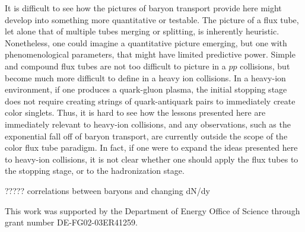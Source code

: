 \documentclass[aps, prc, 12pt, nofootinbib, showpacs, superscriptaddress, tightenlines, groupedaddress]{revtex4-2}
\begin{document}
It is difficult to see how the pictures of baryon transport provide here might develop into something more quantitative or testable. The picture of a flux tube, let alone that of multiple tubes merging or splitting, is inherently heuristic. Nonetheless, one could imagine a quantitative picture emerging, but one with phenomenological parameters, that might have limited predictive power. Simple and compound flux tubes are not too difficult to picture in a $pp$ collisions, but become much more difficult to define in a heavy ion collisions. In a heavy-ion environment, if one produces a quark-gluon plasma, the initial stopping stage does not require creating strings of quark-antiquark pairs to immediately create color singlets. Thus, it is hard to see how the lessons presented here are immediately relevant to heavy-ion collisions, and any observations, such as the exponential fall off of baryon transport, are currently outside the scope of the color flux tube paradigm. In fact, if one were to expand the ideas presented here to heavy-ion collisions, it is not clear whether one should apply the flux tubes to the stopping stage, or to the hadronization stage.

????? correlations between baryons and changing dN/dy


\begin{acknowledgments}
This work was supported by the Department of Energy Office of Science through grant number DE-FG02-03ER41259.
\end{acknowledgments}


\end{document}
